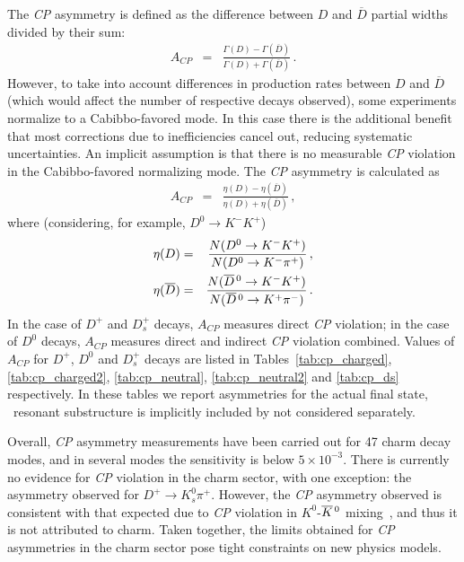\vspace{0.8cm}
The \emph{CP} asymmetry is defined as the difference between 
$D$ and $\overline{D}$ partial widths divided by their sum:
\begin{eqnarray}  
A_{CP} & = & \frac{\Gamma(D)-\Gamma(\overline{D})}
{\Gamma(D)+\Gamma(\overline{D})}\,.
\end{eqnarray}
However, to take into account differences in production rates between 
$D$ and $\overline{D}$ (which would affect the number of respective 
decays observed), some experiments normalize to a Cabibbo-favored 
mode. In this case there is the additional benefit that most corrections 
due to inefficiencies cancel out, reducing systematic uncertainties. An 
implicit assumption is that there is no measurable \emph{CP} 
violation in the Cabibbo-favored normalizing mode. 
The \emph{CP} asymmetry is calculated as
\begin{eqnarray}
A_{CP} & = & \frac{\eta(D)-\eta(\overline{D})}{\eta(D)+\eta(\overline{D})}\,,
\end{eqnarray}
where (considering, for example, $D^0 \to K^-K^+$)
\begin{eqnarray}
 \eta(D) & = & \frac{N(D^0 \rightarrow K^-K^+)}{N(D^0 \rightarrow K^-\pi^+)}\,, \\
 \eta(\overline{D}) & = & \frac{N(\overline{D}{}^{\,0}\rightarrow K^-K^+)}
{N(\overline{D}{}^{\,0}\rightarrow K^+\pi^-)}\,.
\end{eqnarray}
In the case of $D^+$ and $D^+_s$ decays, $A^{}_{CP}$ measures 
direct \emph{CP} violation; in the case of $D^0$ decays, $A^{}_{CP}$ 
measures direct and indirect \emph{CP} violation combined.
Values of $A^{}_{CP}$ for $D^+$, $D^0$ and $D_s^+$ decays are listed in
Tables~\ref{tab:cp_charged}, \ref{tab:cp_charged2}, \ref{tab:cp_neutral}, \ref{tab:cp_neutral2} and \ref{tab:cp_ds} respectively.
In these tables we report asymmetries for the actual
final state, \ie\ resonant substructure is implicitly 
included by not considered separately.

Overall, \emph{CP} asymmetry measurements have been
carried out for 47 charm decay modes, and in
several modes the sensitivity is below $5 \times 10^{-3}$. 
There is currently no evidence for \emph{CP} violation in
the charm sector, with one exception: the asymmetry
observed for $D^+ \to K^0_s\pi^+$. 
However, the \emph{CP} asymmetry observed is consistent
with that expected due to \emph{CP} violation in
$K^0$-$\overline{K}{}^{\,0}$ mixing~\cite{Grossman:2012aa},
and thus it is not attributed to charm.
%
Taken together, the limits obtained for \emph{CP} asymmetries 
in the charm sector pose tight constraints on new physics models.

